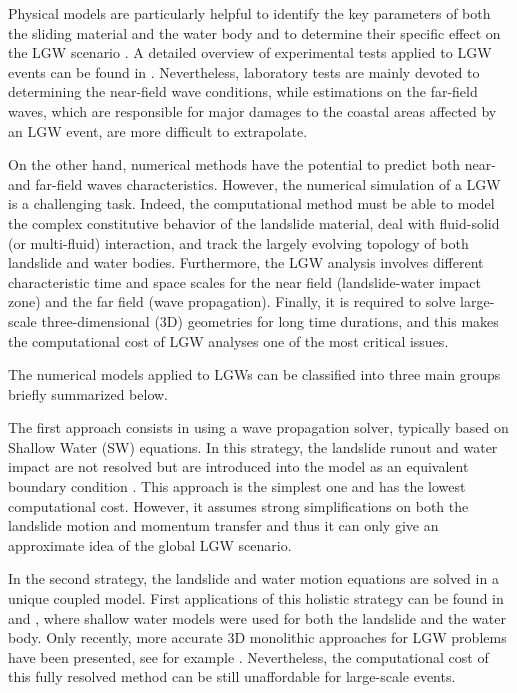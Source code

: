 Physical models are particularly helpful to identify the key parameters of both the sliding material and the water body and to determine their specific effect on the LGW scenario \cite{noda1970water, fritz2004near, heller2011wave, mohammed2012physical, romano2016, mulligan2017, evers2019spatial}. A detailed overview of experimental tests applied to LGW events can be found in \cite{yavari2017subaerial}. Nevertheless, laboratory tests are mainly devoted to determining the near-field wave conditions, while estimations on the far-field waves, which are responsible for major damages to the coastal areas affected by an LGW event, are more difficult to extrapolate.

On the other hand, numerical methods have the potential to predict both near- and far-field waves characteristics. However, the numerical simulation of a LGW is a challenging task. Indeed, the computational method must be able to model the complex constitutive behavior of the landslide material, deal with fluid-solid (or multi-fluid) interaction, and track the largely evolving topology of both landslide and water bodies. Furthermore, the LGW analysis involves different characteristic time and space scales for the near field (landslide-water impact zone) and the far field (wave propagation). Finally, it is required to solve large-scale three-dimensional (3D) geometries for long time durations, and this makes the computational cost of LGW analyses one of the most critical issues.

The numerical models applied to LGWs can be classified into three main groups \cite{yavari2016numerical} briefly summarized below.

The first approach consists in using a wave propagation solver, typically based on Shallow Water (SW) equations. In this strategy, the landslide runout and water impact are not resolved but are introduced into the model as an equivalent boundary condition \cite{waythomas2003numerical, ataie2008mapping}. This approach is the simplest one and has the lowest computational cost. However, it assumes strong simplifications on both the landslide motion and momentum transfer and thus it can only give an approximate idea of the global LGW scenario.

In the second strategy, the landslide and water motion equations are solved in a unique coupled model. First applications of this holistic strategy can be found in \cite{kelfoun2010landslide} and \cite{giachetti2011numerical}, where shallow water models were used for both the landslide and the water body.
Only recently, more accurate 3D monolithic approaches for LGW problems have been presented, see for example
\cite{vacondio20133d, CrostaVajont, franci20203dA, franci20203dB, xu2021sph, terada2021}. Nevertheless, the computational cost of this fully resolved method can be still unaffordable for large-scale events.

